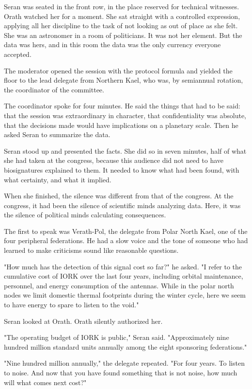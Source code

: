 \documentclass[11pt,a5paper,twoside]{book}
\begin{document}
Seran was seated in the front row, in the place reserved for technical witnesses. Orath watched her for a moment. She sat straight with a controlled expression, applying all her discipline to the task of not looking as out of place as she felt. She was an astronomer in a room of politicians. It was not her element. But the data was hers, and in this room the data was the only currency everyone accepted.

The moderator opened the session with the protocol formula and yielded the floor to the lead delegate from Northern Kael, who was, by semiannual rotation, the coordinator of the committee.

The coordinator spoke for four minutes. He said the things that had to be said: that the session was extraordinary in character, that confidentiality was absolute, that the decisions made would have implications on a planetary scale. Then he asked Seran to summarize the data.

Seran stood up and presented the facts. She did so in seven minutes, half of what she had taken at the congress, because this audience did not need to have biosignatures explained to them. It needed to know what had been found, with what certainty, and what it implied.

When she finished, the silence was different from that of the congress. At the congress, it had been the silence of scientific minds analyzing data. Here, it was the silence of political minds calculating consequences.

The first to speak was Verath-Pol, the delegate from Polar North Kael, one of the four peripheral federations. He had a slow voice and the tone of someone who had learned to make criticisms sound like reasonable questions.

"How much has the detection of this signal cost so far?" he asked. "I refer to the cumulative cost of IORK over the last four years, including orbital maintenance, personnel, and energy consumption of the antennas. While in the polar north nodes we limit domestic thermal footprints during the winter cycle, here we seem to have energy to spare to listen to the void."

Seran looked at Orath. Orath silently authorized her.

"The operating budget of IORK is public," Seran said. "Approximately nine hundred million standard units annually among the eight sponsoring federations."

"Nine hundred million annually," the delegate repeated. "For four years. To listen to noise. And now that you have found something that is not noise, how much will what comes next cost?"
\end{document}

